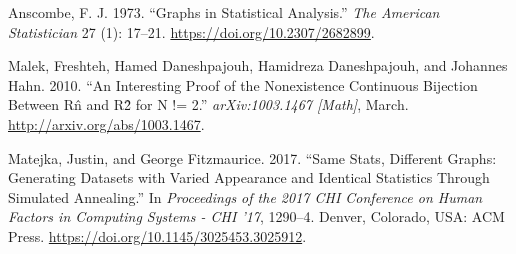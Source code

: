\documentclass[runningheads,español]{llncs}
\begin{document}
\hypertarget{refs}{}
\leavevmode\hypertarget{ref-anscombe1973}{}%
Anscombe, F. J. 1973. ``Graphs in Statistical Analysis.'' \emph{The
American Statistician} 27 (1): 17--21.
\url{https://doi.org/10.2307/2682899}.

\leavevmode\hypertarget{ref-malek2010}{}%
Malek, Freshteh, Hamed Daneshpajouh, Hamidreza Daneshpajouh, and
Johannes Hahn. 2010. ``An Interesting Proof of the Nonexistence
Continuous Bijection Between Rn̂ and R2̂ for N != 2.''
\emph{arXiv:1003.1467 {[}Math{]}}, March.
\url{http://arxiv.org/abs/1003.1467}.

\leavevmode\hypertarget{ref-matejka2017}{}%
Matejka, Justin, and George Fitzmaurice. 2017. ``Same Stats, Different
Graphs: Generating Datasets with Varied Appearance and Identical
Statistics Through Simulated Annealing.'' In \emph{Proceedings of the
2017 CHI Conference on Human Factors in Computing Systems - CHI '17},
1290--4. Denver, Colorado, USA: ACM Press.
\url{https://doi.org/10.1145/3025453.3025912}.
%
%
%
% 

% 
%

%
\end{document}

